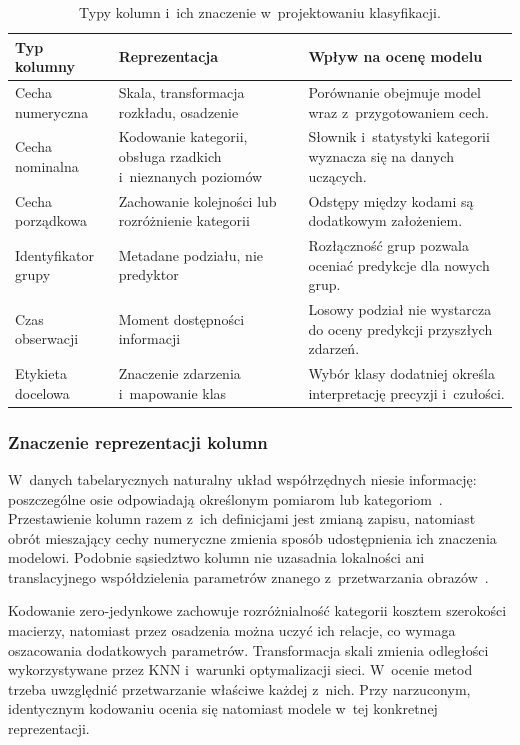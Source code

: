 \begin{table}[!htbp]
\centering
\caption{Typy kolumn i~ich znaczenie w~projektowaniu klasyfikacji.}
\label{tab:role-kolumn}
\small
\begin{tabularx}{\textwidth}{@{}P{0.22\textwidth}YY@{}}
\toprule
Typ kolumny & Reprezentacja & Wpływ na ocenę modelu \\
\midrule
Cecha numeryczna & Skala, transformacja rozkładu, osadzenie & Porównanie obejmuje model wraz z~przygotowaniem cech. \\
Cecha nominalna & Kodowanie kategorii, obsługa rzadkich i~nieznanych poziomów & Słownik i~statystyki kategorii wyznacza się na danych uczących. \\
Cecha porządkowa & Zachowanie kolejności lub rozróżnienie kategorii & Odstępy między kodami są dodatkowym założeniem. \\
Identyfikator grupy & Metadane podziału, nie predyktor & Rozłączność grup pozwala oceniać predykcje dla nowych grup. \\
Czas obserwacji & Moment dostępności informacji & Losowy podział nie wystarcza do oceny predykcji przyszłych zdarzeń. \\
Etykieta docelowa & Znaczenie zdarzenia i~mapowanie klas & Wybór klasy dodatniej określa interpretację precyzji i~czułości. \\
\bottomrule
\end{tabularx}
\end{table}

\subsubsection{Znaczenie reprezentacji kolumn}
\label{sec:reprezentacja-zalozenia}

W~danych tabelarycznych naturalny układ współrzędnych niesie informację: poszczególne osie odpowiadają określonym pomiarom lub kategoriom~\cite{grinsztajn2022trees}. Przestawienie kolumn razem z~ich definicjami jest zmianą zapisu, natomiast obrót mieszający cechy numeryczne zmienia sposób udostępnienia ich znaczenia modelowi. Podobnie sąsiedztwo kolumn nie uzasadnia lokalności ani translacyjnego współdzielenia parametrów znanego z~przetwarzania obrazów~\cite{borisov2022survey}.

Kodowanie zero-jedynkowe zachowuje rozróżnialność kategorii kosztem szerokości macierzy, natomiast przez osadzenia można uczyć ich relacje, co wymaga oszacowania dodatkowych parametrów. Transformacja skali zmienia odległości wykorzystywane przez KNN i~warunki optymalizacji sieci. W~ocenie metod trzeba uwzględnić przetwarzanie właściwe każdej z~nich. Przy narzuconym, identycznym kodowaniu ocenia się natomiast modele w~tej konkretnej reprezentacji.


